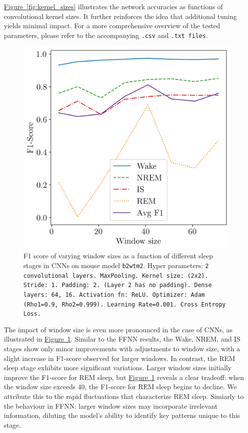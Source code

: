 \documentclass{article}
\begin{document}
\begin{multicols}{2}
\hyperref[fig:kernel_sizes]{Figure~\ref*{fig:kernel_sizes}} illustrates the network accuracies as functions of convolutional kernel sizes. It further reinforces the idea that additional tuning yields minimal impact. For a more comprehensive overview of the tested parameters, please refer to the accompanying \texttt{.csv} and \texttt{.txt files}.

\begin{figure}[H]
    \centering
    \includegraphics[width=\linewidth]{figures/1d_plot_f1_score_cnn_trial_8_mouse_b2wtm2.csv.png} 
    \caption{F1 score of varying window sizes as a function of different sleep stages in CNNs on mouse model \texttt{b2wtm2}. Hyper parameters: \texttt{2 convolutional layers. MaxPooling. Kernel size: (2x2). Stride: 1. Padding: 2. (Layer 2 has no padding). Dense layers: 64, 16. Activation fn: ReLU. Optimizer: Adam (Rho1=0.9, Rho2=0.999). Learning Rate=0.001. Cross Entropy Loss.}}
    \label{fig:window_sizes_cnn}
\end{figure}

The impact of window size is even more pronounced in the case of CNNs, as illustrated in \hyperref[fig:window_sizes_cnn]{Figure~\ref*{fig:window_sizes_cnn}}. Similar to the FFNN results, the Wake, NREM, and IS stages show only minor improvements with adjustments to window size, with a slight increase in F1-score observed for larger windows. In contrast, the REM sleep stage exhibits more significant variations. Larger window sizes initially improve the F1-score for REM sleep, but \hyperref[fig:window_sizes_cnn]{Figure~\ref*{fig:window_sizes_cnn}} reveals a clear tradeoff: when the window size exceeds 40, the F1-score for REM sleep begins to decline. We attribute this to the rapid fluctuations that characterize REM sleep. Simiarly to the behaviour in FFNN: larger window sizes may incorporate irrelevant information, diluting the model's ability to identify key patterns unique to this stage.


\end{multicols}
\end{document}
